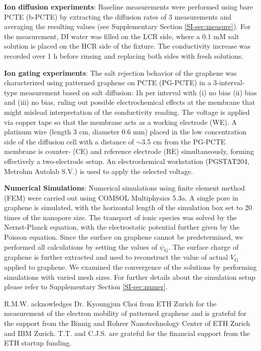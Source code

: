 \documentclass[journal=langd5,email=true, hyperref=true, keywords=false]{achemso}
\begin{document}
\vspace{1em}
\noindent
\textbf{Ion diffusion experiments}: Baseline measurements were
performed using bare PCTE (b-PCTE) by extracting the diffusion rates
of 3 measurements and averaging the resulting values (see
Supplementary Section \ref{SI-sec:measure}). For the measurement, DI water was filled on
the LCR side, where a 0.1 mM salt solution is placed on the HCR side
of the fixture. The conductivity increase was recorded over 1 h before
rinsing and replacing both sides with fresh solutions.

\vspace{1em}
\noindent
\textbf{Ion gating experiments}: The salt rejection behavior of the graphene
was characterized using patterned graphene on PCTE (PG-PCTE) in a
3-interval-type measurement based on salt diffusion: 1h per interval
with (i) no bias (ii) bias and (iii) no bias, ruling out possible
electrochemical effects at the membrane that might mislead
interpretation of the conductivity reading. The voltage is applied via
copper tape so that the membrane acts as a working electrode (WE). A
platinum wire (length 3 cm, diameter 0.6 mm) placed in the low
concentration side of the diffusion cell with a distance of $\sim$3.5 cm
from the PG-PCTE membrane is counter- (CE) and reference electrode
(RE) simultaneously, forming effectively a two-electrode setup. An
electrochemical workstation (PGSTAT204, Metrohm Autolab S.V.) is used
to apply the selected voltage.

\vspace{1em}
\noindent
\textbf{Numerical Simulations}: Numerical simulations using finite
element method (FEM) were carried out using COMSOL Multiphysics
5.3a. A single pore in graphene is simulated, with the horizontal
length of the simulation box set to 20 times of the nanopore size. The
transport of ionic species was solved by the Nernst-Planck equation,
with the electrostatic potential further given by the Poisson
equation. Since the surface on graphene cannot be predetermined, we
performed all calculations by setting the values of
$\psi_{\mathrm{G}}$. The surface charge of graphene is further
extracted and used to reconstruct the value of actual $V_{\mathrm{G}}$
applied to graphene. We examined the convergence of the solutions by
performing simulations with varied mesh sizes. For further details
about the simulation setup please refer to Supplementary Section
\ref{SI-sec:numer}.


\begin{acknowledgement}
  R.M.W. acknowledges Dr. Kyoungjun Choi from ETH Zurich for the measurement of the electron mobility 
  of patterned graphene and is grateful for the support from the Binnig and Rohrer
  Nanotechnology Center of ETH Zurich and IBM Zurich. T.T. and
  C.J.S. are grateful for the financial support from the ETH startup
  funding. 
\end{acknowledgement}
\end{document}

